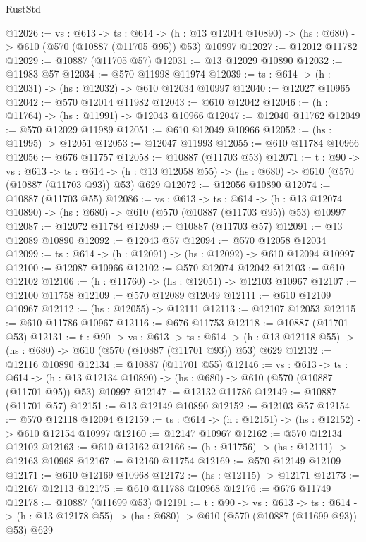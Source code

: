 \begin{lexlean}{RustStd}
\begin{coremodule}
@12026 := {vs : @613} ->
  {ts : @614} ->
  (h : @13 @12014 @10890) -> (hs : @680) -> @610 (@570 (@10887 (@11705 @95)) @53) @10997
@12027 := @12012 @11782
@12029 := @10887 (@11705 @57)
@12031 := @13 @12029 @10890
@12032 := @11983 @57
@12034 := @570 @11998 @11974
@12039 := {ts : @614} -> (h : @12031) -> (hs : @12032) -> @610 @12034 @10997
@12040 := @12027 @10965
@12042 := @570 @12014 @11982
@12043 := @610 @12042
@12046 := (h : @11764) -> (hs : @11991) -> @12043 @10966
@12047 := @12040 @11762
@12049 := @570 @12029 @11989
@12051 := @610 @12049 @10966
@12052 := (hs : @11995) -> @12051
@12053 := @12047 @11993
@12055 := @610 @11784 @10966
@12056 := @676 @11757
@12058 := @10887 (@11703 @53)
@12071 := {t : @90} ->
  {vs : @613} ->
  {ts : @614} -> (h : @13 @12058 @55) -> (hs : @680) -> @610 (@570 (@10887 (@11703 @93)) @53) @629
@12072 := @12056 @10890
@12074 := @10887 (@11703 @55)
@12086 := {vs : @613} ->
  {ts : @614} ->
  (h : @13 @12074 @10890) -> (hs : @680) -> @610 (@570 (@10887 (@11703 @95)) @53) @10997
@12087 := @12072 @11784
@12089 := @10887 (@11703 @57)
@12091 := @13 @12089 @10890
@12092 := @12043 @57
@12094 := @570 @12058 @12034
@12099 := {ts : @614} -> (h : @12091) -> (hs : @12092) -> @610 @12094 @10997
@12100 := @12087 @10966
@12102 := @570 @12074 @12042
@12103 := @610 @12102
@12106 := (h : @11760) -> (hs : @12051) -> @12103 @10967
@12107 := @12100 @11758
@12109 := @570 @12089 @12049
@12111 := @610 @12109 @10967
@12112 := (hs : @12055) -> @12111
@12113 := @12107 @12053
@12115 := @610 @11786 @10967
@12116 := @676 @11753
@12118 := @10887 (@11701 @53)
@12131 := {t : @90} ->
  {vs : @613} ->
  {ts : @614} -> (h : @13 @12118 @55) -> (hs : @680) -> @610 (@570 (@10887 (@11701 @93)) @53) @629
@12132 := @12116 @10890
@12134 := @10887 (@11701 @55)
@12146 := {vs : @613} ->
  {ts : @614} ->
  (h : @13 @12134 @10890) -> (hs : @680) -> @610 (@570 (@10887 (@11701 @95)) @53) @10997
@12147 := @12132 @11786
@12149 := @10887 (@11701 @57)
@12151 := @13 @12149 @10890
@12152 := @12103 @57
@12154 := @570 @12118 @12094
@12159 := {ts : @614} -> (h : @12151) -> (hs : @12152) -> @610 @12154 @10997
@12160 := @12147 @10967
@12162 := @570 @12134 @12102
@12163 := @610 @12162
@12166 := (h : @11756) -> (hs : @12111) -> @12163 @10968
@12167 := @12160 @11754
@12169 := @570 @12149 @12109
@12171 := @610 @12169 @10968
@12172 := (hs : @12115) -> @12171
@12173 := @12167 @12113
@12175 := @610 @11788 @10968
@12176 := @676 @11749
@12178 := @10887 (@11699 @53)
@12191 := {t : @90} ->
  {vs : @613} ->
  {ts : @614} -> (h : @13 @12178 @55) -> (hs : @680) -> @610 (@570 (@10887 (@11699 @93)) @53) @629

\end{coremodule}
\end{lexlean}
